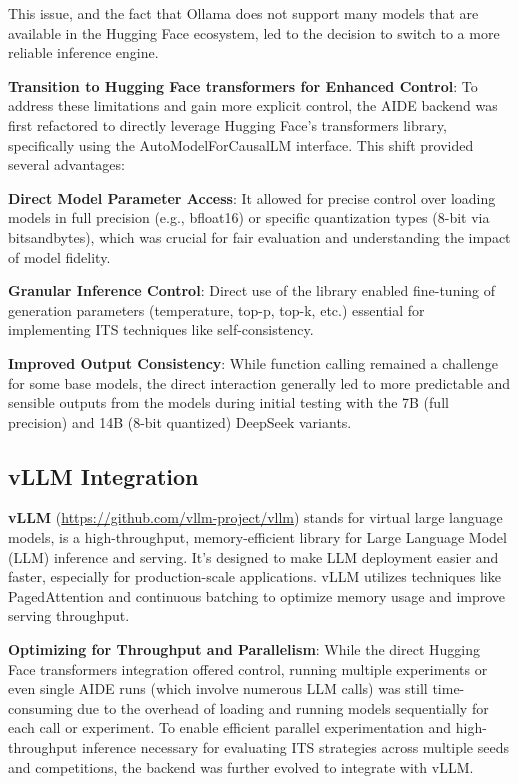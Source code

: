 This issue, and the fact that Ollama does not support many models that are available in the Hugging Face ecosystem, led to the decision to switch to a more reliable inference engine.


\textbf{Transition to Hugging Face transformers for Enhanced Control}:
To address these limitations and gain more explicit control, the AIDE backend was first refactored to directly leverage Hugging Face's transformers library, specifically using the AutoModelForCausalLM interface. This shift provided several advantages:

\textbf{Direct Model Parameter Access}: It allowed for precise control over loading models in full precision (e.g., bfloat16) or specific quantization types (8-bit via bitsandbytes), which was crucial for fair evaluation and understanding the impact of model fidelity.

\textbf{Granular Inference Control}: Direct use of the library enabled fine-tuning of generation parameters (temperature, top-p, top-k, etc.) essential for implementing ITS techniques like self-consistency.

\textbf{Improved Output Consistency}: While function calling remained a challenge for some base models, the direct interaction generally led to more predictable and sensible outputs from the models during initial testing with the 7B (full precision) and 14B (8-bit quantized) DeepSeek variants.

\subsection{vLLM Integration}

\textbf{vLLM} (\url{https://github.com/vllm-project/vllm}) stands for virtual large language models, is a high-throughput, memory-efficient library for Large Language Model (LLM) inference and serving. It's designed to make LLM deployment easier and faster, especially for production-scale applications. vLLM utilizes techniques like PagedAttention and continuous batching to optimize memory usage and improve serving throughput.

\textbf{Optimizing for Throughput and Parallelism}:
While the direct Hugging Face transformers integration offered control, running multiple experiments or even single AIDE runs (which involve numerous LLM calls) was still time-consuming due to the overhead of loading and running models sequentially for each call or experiment. To enable efficient parallel experimentation and high-throughput inference necessary for evaluating ITS strategies across multiple seeds and competitions, the backend was further evolved to integrate with vLLM.

